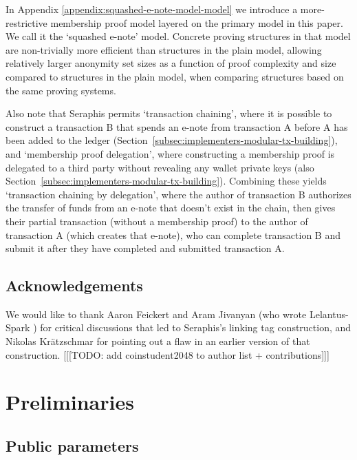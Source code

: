In Appendix \ref{appendix:squashed-e-note-model-model} we introduce a more-restrictive membership proof model layered on the primary model in this paper. We call it the `squashed e-note' model. Concrete proving structures in that model are non-trivially more efficient than structures in the plain model, allowing relatively larger anonymity set sizes as a function of proof complexity and size compared to structures in the plain model, when comparing structures based on the same proving systems.

Also note that Seraphis permits `transaction chaining', where it is possible to construct a transaction B that spends an e-note from transaction A before A has been added to the ledger (Section~\ref{subsec:implementers-modular-tx-building}), and `membership proof delegation', where constructing a membership proof is delegated to a third party without revealing any wallet private keys (also Section~\ref{subsec:implementers-modular-tx-building}). Combining these yields `transaction chaining by delegation', where the author of transaction B authorizes the transfer of funds from an e-note that doesn't exist in the chain, then gives their partial transaction (without a membership proof) to the author of transaction A (which creates that e-note), who can complete transaction B and submit it after they have completed and submitted transaction A.


\subsection{Acknowledgements}
\label{subsec:intro-acknowledgements}

We would like to thank Aaron Feickert and Aram Jivanyan (who wrote Lelantus-Spark \cite{lelantus-spark}) for critical discussions that led to Seraphis's linking tag construction, and Nikolas Kr{\"{a}}tzschmar for pointing out a flaw in an earlier version of that construction. [[[TODO: add coinstudent2048 to author list + contributions]]]



\section{Preliminaries}
\label{sec:preliminaries}

\subsection{Public parameters}
\label{subsec:preliminaries-public-parameters}

